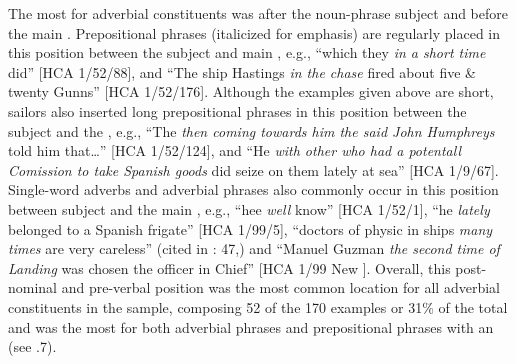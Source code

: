 The most  for adverbial constituents was after the noun-phrase subject and before the main . Prepositional phrases (italicized for emphasis) are regularly placed in this position between the subject and main , e.g., “which they \textit{in a short time} did” [HCA 1/52/88], and “The ship Hastings \textit{in the chase} fired about five \& twenty Gunns” [HCA 1/52/176]. Although the examples given above are short, sailors also inserted long prepositional phrases in this position between the subject and the , e.g., “The  \textit{then coming towards him the said John Humphreys} told him that…” [HCA 1/52/124], and “He \textit{with other who had a potentall Comission to take Spanish goods} did seize on them lately at sea” [HCA 1/9/67]. Single-word adverbs and adverbial phrases also commonly occur in this position between subject and the main , e.g., “hee \textit{well} know” [HCA 1/52/1], “he \textit{lately} belonged to a Spanish frigate” [HCA 1/99/5], “doctors of physic in ships \textit{many times} are very careless” (cited in \citealt{Brown2011}: 47,) and “Manuel Guzman \textit{the second time of Landing} was chosen the officer in Chief” [HCA 1/99 New \citealt{Providence1722}]. Overall, this post-nominal and pre-verbal position was the most common location for all adverbial constituents in the sample, composing 52 of the 170 examples or 31\% of the total and was the most  for both adverbial phrases and prepositional phrases with an  (see .7). 

